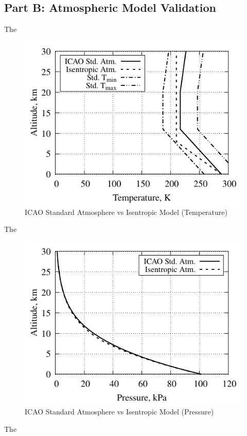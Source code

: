\documentclass[conf]{new-aiaa} %
\begin{document}
\subsection{Part B: Atmospheric Model Validation}
The

\begin{figure}[hbt!]
\centering
\includegraphics[]{media/atmosphere_validation_files/ICAO_vs_ISEN_temperature.pdf}
\caption{\label{fig:partbtemp} ICAO Standard Atmosphere vs Isentropic Model (Temperature)}
\end{figure}
The

\begin{figure}[hbt!]
\centering
\includegraphics[]{media/atmosphere_validation_files/ICAO_vs_ISEN_pressure.pdf}
\caption{\label{fig:partbpres}ICAO Standard Atmosphere vs Isentropic Model (Pressure)}
\end{figure}
The
\end{document}
